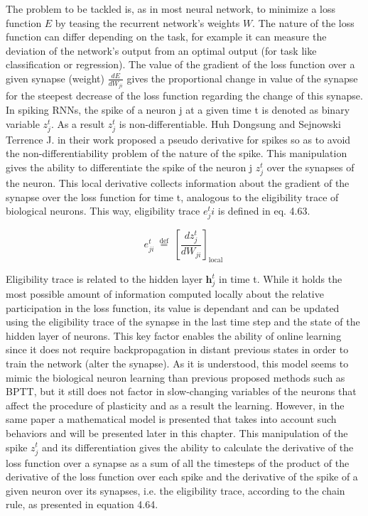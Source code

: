\documentclass[12pt]{report}
\begin{document}
The problem to be tackled is, as in most neural network, to minimize a loss function \(E\) by teasing the recurrent network's weights \(W\). The nature of the loss function can differ depending on the task, for example it can measure the deviation of the network's output from an optimal output (for task like classification or regression). The value of the gradient of the loss function over a given synapse (weight) \(\frac{dE}{dW_{ji}}\) gives the proportional change in value of the synapse for the steepest decrease of the loss function regarding the change of this synapse. In spiking RNNs, the spike of a neuron j at a given time t is denoted as binary variable \(z^t_j\). As a result \(z^t_j\) is non-differentiable. Huh Dongsung and Sejnowski Terrence J. in their work \cite{Huh2018} proposed a pseudo derivative for spikes so as to avoid the non-differentiability problem of the nature of the spike. This manipulation gives the ability to differentiate the spike of the neuron j \(z^t_j\) over the synapses of the neuron. This local derivative collects information about the gradient of the synapse over the loss function for time t, analogous to the eligibility trace of biological neurons. This way, eligibility trace \(e^t_ji\) is defined in eq. 4.63.

\begin{equation}
    e_{j i}^{t} \stackrel{\text { def }}{=}\left[\frac{d z_{j}^{t}}{d W_{j i}}\right]_{\text {local }}
\end{equation}

Eligibility trace is related to the hidden layer $\mathbf{h}_{j}^{t}$ in time t. While it holds the most possible amount of information computed locally about the relative participation in the loss function, its value is dependant and can be updated using the eligibility trace of the synapse in the last time step and the state of the hidden layer of neurons. This key factor enables the ability of online learning since it does not require backpropagation in distant previous states in order to train the network (alter the synapse). As it is understood, this model seems to mimic the biological neuron learning than previous proposed methods such as BPTT, but it still does not factor in slow-changing variables of the neurons that affect the procedure of plasticity and as a result the learning. However, in the same paper \cite{Bellec2020} a mathematical model is presented that takes into account such behaviors and will be presented later in this chapter. 
This manipulation of the spike \(z^t_j\) and its differentiation gives the ability to calculate the derivative of the loss function over a synapse as a sum of all the timesteps of the product of the derivative of the loss function over each spike and the derivative of the spike of a given neuron over its synapses, i.e. the eligibility trace, according to the chain rule, as presented in equation 4.64.
\end{document}
